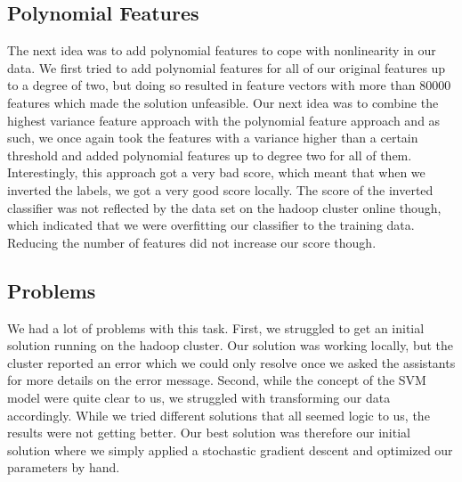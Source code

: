 \documentclass[a4paper, 11pt]{article}
\begin{document}
\subsection{Polynomial Features}
The next idea was to add polynomial features to cope with nonlinearity in our data. We first tried
to add polynomial features for all of our original features up to a degree of two, but doing so 
resulted in feature vectors with more than 80000 features which made the solution unfeasible. Our
next idea was to combine the highest variance feature approach with the polynomial feature approach
and as such, we once again took the features with a variance higher than a certain threshold and added polynomial features up to degree two for all of them. 
\vspace{8pt}
Interestingly, this approach got a very bad score, which meant that when we inverted the labels, we
got a very good score locally. The score of the inverted classifier was not reflected by the data set on the hadoop cluster online though, which indicated that we were overfitting our classifier to
the training data. Reducing the number of features did not increase our score though.

\subsection{Problems}
We had a lot of problems with this task. First, we struggled to get an initial solution running on the hadoop cluster. Our solution was working locally, but the cluster reported an error which we could only resolve once we asked the assistants for more details on the error message.
\vspace{8pt}
Second, while the concept of the SVM model were quite clear to us, we struggled with transforming our data accordingly. While we tried different solutions that all seemed logic to us, the results
were not getting better. Our best solution was therefore our initial solution where we simply applied a stochastic gradient descent and optimized our parameters by hand.
\end{document}
